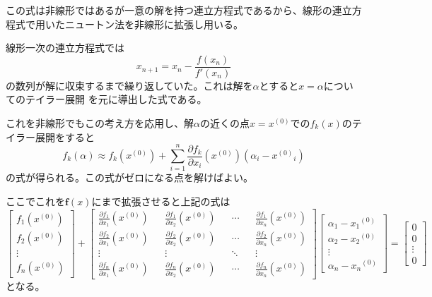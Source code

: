 \documentclass[a4paper,11pt]{jsarticle}
\begin{document}
この式は非線形ではあるが一意の解を持つ連立方程式であるから、線形の連立方程式で用いたニュートン法を非線形に拡張し用いる。

線形一次の連立方程式では
\begin{equation*}
    x_{n+1} = x_n - \frac{f(x_n)}{f'(x_n)}
\end{equation*}
の数列が解に収束するまで繰り返していた。これは解を$\alpha$とすると$x=\alpha$についてのテイラー展開
を元に導出した式である。

これを非線形でもこの考え方を応用し、解$\alpha$の近くの点$x=x^{(0)}$での$f_k(x)$のテイラー展開をすると
\begin{displaymath}
    f_k(\alpha) \approx f_k(x^{(0)}) + \sum_{i=1}^{n}\frac{\partial f_k}{\partial x_i}(x^{(0)})(\alpha_i - {x^{(0)}}_i)
\end{displaymath}
の式が得られる。この式がゼロになる点を解けばよい。

ここでこれを$\textbf{f}(x)$にまで拡張させると上記の式は
\begin{equation*}
    \begin{bmatrix}
        f_1(x^{(0)}) \\ f_2(x^{(0)}) \\ \vdots \\ f_n(x^{(0)})
    \end{bmatrix}
    + 
    \begin{bmatrix}
        \frac{\partial f_1}{\partial x_1}(x^{(0)}) && \frac{\partial f_1}{\partial x_2}(x^{(0)}) && \cdots && \frac{\partial f_1}{\partial x_n}(x^{(0)}) \\
        \frac{\partial f_2}{\partial x_1}(x^{(0)}) && \frac{\partial f_2}{\partial x_2}(x^{(0)}) && \cdots && \frac{\partial f_2}{\partial x_n}(x^{(0)}) \\
        \vdots && \vdots && \ddots && \vdots \\
        \frac{\partial f_n}{\partial x_1}(x^{(0)}) && \frac{\partial f_n}{\partial x_2}(x^{(0)}) && \cdots && \frac{\partial f_n}{\partial x_n}(x^{(0)}) 
    \end{bmatrix}
    \begin{bmatrix}
        \alpha_1 - {x_1}^{(0)} \\ \alpha_2 - {x_2}^{(0)} \\ \vdots \\ \alpha_n - {x_n}^{(0)}
    \end{bmatrix}
    =
    \begin{bmatrix}
        0 \\ 0 \\ \vdots \\ 0
    \end{bmatrix}
\end{equation*}
となる。
\end{document}
